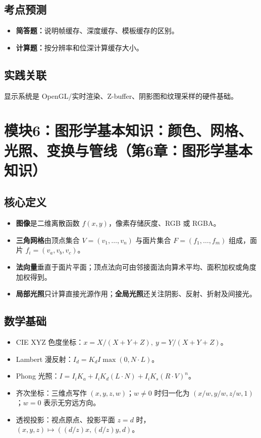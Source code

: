 \documentclass[UTF8,fontset=fandol,11pt]{ctexart}
\newcommand{\key}[1]{\textbf{#1}}
\newcommand{\exam}[1]{\textcolor{blue!55!black}{\textbf{#1}}}
\begin{document}
\subsection{考点预测}
\begin{itemize}
  \item \exam{简答题：}说明帧缓存、深度缓存、模板缓存的区别。
  \item \exam{计算题：}按分辨率和位深计算缓存大小。
\end{itemize}
\subsection{实践关联}
显示系统是 OpenGL/实时渲染、Z-buffer、阴影图和纹理采样的硬件基础。

\section{模块6：图形学基本知识：颜色、网格、光照、变换与管线（第6章：图形学基本知识）}
\subsection{核心定义}
\begin{itemize}
  \item \key{图像}是二维离散函数 $f(x,y)$，像素存储灰度、RGB 或 RGBA。
  \item \key{三角网格}由顶点集合 $V=(v_1,\ldots,v_n)$ 与面片集合 $F=(f_1,\ldots,f_m)$ 组成，面片 $f_i=(v_a,v_b,v_c)$。
  \item \key{法向量}垂直于面片平面；顶点法向可由邻接面法向算术平均、面积加权或角度加权得到。
  \item \key{局部光照}只计算直接光源作用；\key{全局光照}还关注阴影、反射、折射及间接光。
\end{itemize}
\subsection{数学基础}
\begin{itemize}
  \item CIE XYZ 色度坐标：$x=X/(X+Y+Z),\ y=Y/(X+Y+Z)$。
  \item Lambert 漫反射：$I_d=K_d I\max(0,N\cdot L)$。
  \item Phong 光照：$I=I_iK_a+I_iK_d(L\cdot N)+I_iK_s(R\cdot V)^n$。
  \item 齐次坐标：三维点写作 $(x,y,z,w)$；$w\neq0$ 时归一化为 $(x/w,y/w,z/w,1)$；$w=0$ 表示无穷远方向。
  \item 透视投影：视点原点、投影平面 $z=d$ 时，$(x,y,z)\mapsto((d/z)x,(d/z)y,d)$。
\end{itemize}
\end{document}
